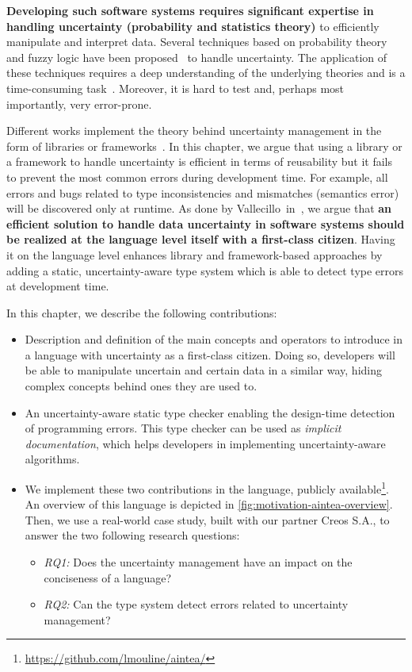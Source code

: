 \textbf{Developing such software systems requires significant expertise in handling uncertainty (probability and statistics theory)} to efficiently manipulate and interpret data. 
Several techniques based on probability theory and fuzzy logic have been proposed~\cite{zadeh1996fuzzy,metrology2008evaluation,shafer1992dempster} to handle uncertainty. 
The application of these techniques requires a deep understanding of the underlying theories and is a time-consuming task~\cite{DBLP:conf/quatic/VallecilloMO16}.
Moreover, it is hard to test and, perhaps most importantly, very error-prone.

Different works implement the theory behind uncertainty management in the form of libraries or frameworks~\cite{url:InferNET18, baudin2017openturns}.  
In this chapter, we argue that using a library or a framework to handle uncertainty is efficient in terms of reusability but it fails to prevent the most common errors during development time. 
For example, all errors and bugs related to type inconsistencies and mismatches (semantics error) will be discovered only at runtime.
As done by Vallecillo~\etal in~\cite{DBLP:conf/quatic/VallecilloMO16}, we argue that \textbf{an efficient solution to handle data uncertainty in software systems should be realized at the language level itself with a first-class citizen}. 
Having it on the language level enhances library and framework-based approaches by adding a static, uncertainty-aware type system which is able to detect type errors at development time.

In this chapter, we describe the following contributions: 
\begin{itemize}
	\vspace{-0.5em}
	\setlength\itemsep{-0.3em}
    \item Description and definition of the main concepts and operators to introduce in a language with uncertainty as a first-class citizen. Doing so, developers will be able to manipulate uncertain and certain data in a similar way, hiding complex concepts behind ones they are used to. 
    \item An uncertainty-aware static type checker enabling the design-time detection of programming errors. This type checker can be used as \textit{implicit documentation}, which helps developers in implementing uncertainty-aware algorithms.
    \item We implement these two contributions in the \langName{} language, publicly available\footnote{\url{https://github.com/lmouline/aintea/}}. An overview of this language is depicted in \autoref{fig:motivation-aintea-overview}. Then, we use a real-world case study, built with our partner Creos S.A., to answer the two following research questions: 
    \begin{itemize}
   		\vspace{-0.5em}
		\setlength\itemsep{-0.3em}
    	\item \textit{RQ1:} Does the uncertainty management have an impact on the conciseness of a language? 
		\item \textit{RQ2:} Can the type system detect errors related to uncertainty management?
    \end{itemize}
\end{itemize}

